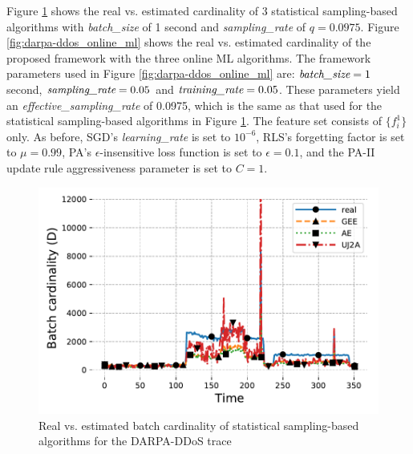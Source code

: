 		Figure \ref{fig:darpa-ddos_statistical} shows the real vs. estimated cardinality of 3 statistical sampling-based algorithms with \emph{batch\_size} of 1 second and \emph{sampling\_rate} of $q=0.0975$. Figure \ref{fig:darpa-ddos_online_ml} shows the real vs. estimated cardinality of the proposed framework with the three online ML algorithms. The framework parameters used in Figure \ref{fig:darpa-ddos_online_ml} are: $\emph{batch\_size} = 1$ second, $\emph{sampling\_rate} = 0.05$ and $\emph{training\_rate} = 0.05$. These parameters yield an \emph{effective\_sampling\_rate} of 0.0975, which is the same as that used for the statistical sampling-based algorithms in Figure \ref{fig:darpa-ddos_statistical}. The feature set consists of $\{f_i^1\}$ only. As before, SGD's \emph{learning\_rate} is set to $10^{-6}$, RLS's forgetting factor is set to $\mu=0.99$, PA's $\epsilon$-insensitive loss function is set to $\epsilon=0.1$, and the PA-II update rule aggressiveness parameter is set to $C=1$.
		
		\begin{figure}[!tb]
			\centering
			\includegraphics[width=.95\linewidth]{img/darpa-ddos_sampling_paper.pdf}
			\caption{Real vs. estimated batch cardinality of statistical sampling-based algorithms for the DARPA-DDoS trace}
			\label{fig:darpa-ddos_statistical}
		\end{figure}
		
